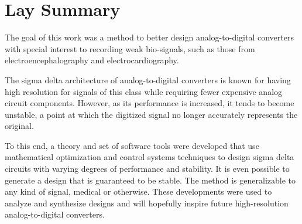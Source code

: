 

\chapter{Lay Summary}

The goal of this work was a method to better design analog-to-digital converters with special interest to recording weak bio-signals, such as those from electroencephalography and electrocardiography.

The sigma delta architecture of analog-to-digital converters is known for having high resolution for signals of this class while requiring fewer expensive analog circuit components. However, as its performance is increased, it tends to become unstable, a point at which the digitized signal no longer accurately represents the original.

To this end, a theory and set of software tools were developed that use mathematical optimization and control systems techniques to design sigma delta circuits with varying degrees of performance and stability. It is even possible to generate a design that is guaranteed to be stable. The method is generalizable to any kind of signal, medical or otherwise. These developments were used to analyze and synthesize designs and will hopefully inspire future high-resolution analog-to-digital converters.
